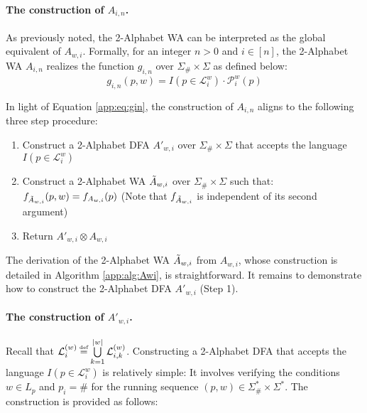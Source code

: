 \paragraph{The construction of $A_{i,n}$.} As previously noted, the 2-Alphabet WA can be interpreted as the global equivalent of $A_{w,i}$. Formally, for an integer $n > 0$ and $i \in [n]$, the 2-Alphabet WA $A_{i,n}$ realizes the function $g_{i,n}$ over $\Sigma_{\#} \times \Sigma$ as defined below:
\begin{equation} \label{app:eq:gin}
g_{i,n}(p,w) = I(p \in \mathcal{L}_{i}^{w}) \cdot \mathcal{P}_{i}^{w}(p)
\end{equation}

In light of Equation \eqref{app:eq:gin}, the construction of $A_{i,n}$ aligns to the following three step procedure:
\begin{enumerate}
    \item Construct a 2-Alphabet DFA $A'_{w,i}$ over $\Sigma_{\#} \times \Sigma$ that accepts the language $I(p \in \mathcal{L}_{i}^{w})$
    \item Construct a 2-Alphabet WA $\Tilde{A}_{w,i}$ over $\Sigma_{\#} \times \Sigma$ such that: $f_{\Tilde{A}_{w,i}}(p,w) = f_{A_{w,i}}(p)$ (Note that $f_{\Tilde{A}_{w,i}}$ is independent of its second argument)
    \item Return $A'_{w,i} \otimes A_{w,i}$ 
\end{enumerate}

The derivation of the 2-Alphabet WA $\Tilde{A}_{w,i}$ from $A_{w,i}$, whose construction is detailed in Algorithm \ref{app:alg:Awi}, is straightforward. It remains to demonstrate how to construct the 2-Alphabet DFA $A'_{w,i}$ (Step 1).

\paragraph{The construction of $A'_{w,i}$.} Recall that $\mathcal{L}_{i}^{(w)} \myeq \bigcup\limits_{k=1}^{|w|} \mathcal{L}_{i,k}^{(w)}$. Constructing a 2-Alphabet DFA that accepts the language $I(p \in \mathcal{L}_{i}^{w})$ is relatively simple: It involves verifying the conditions $w \in L_{p}$ and $p_{i} = \#$ for the running sequence $(p,w) \in \Sigma_{\#}^{*} \times \Sigma^{*}$. The construction is provided as follows:

